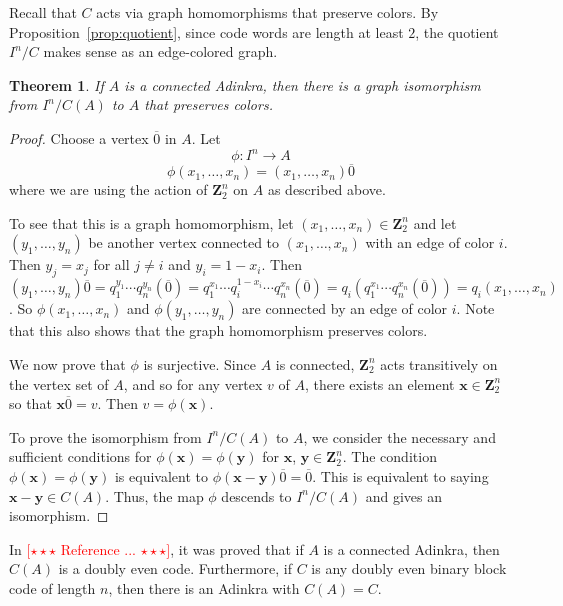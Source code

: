 \documentclass[12pt,twoside,singlespace]{article}
\numberwithin{equation}{section}
\newtheorem{thm}[equation]{Theorem}
\theoremstyle{definition}
\newcommand{\ZZ}{\mathbf{Z}}
\newcommand{\com}[1]{\textcolor{red}{$[\star \star \star$ #1 $\star \star \star]$}}
\renewcommand{\vec}[1]{\mathbf{#1}}
\begin{document}
Recall that $C$ acts via graph homomorphisms that preserve colors.  By Proposition~\ref{prop:quotient}, since code words are length at least $2$, the quotient $I^n/C$ makes sense as an edge-colored graph.

\begin{thm}
\label{thm:cubemodulocode}
If $A$ is a connected Adinkra, then there is a graph isomorphism from $I^n/C(A)$ to $A$ that preserves colors.
\end{thm}
\begin{proof}
Choose a vertex $\overline{0}$ in $A$.  Let
\[\phi:I^n\to A\]
\[\phi(x_1,\ldots,x_n)=(x_1,\ldots,x_n)\overline{0}\]
where we are using the action of $\ZZ_2^n$ on $A$ as described above.

To see that this is a graph homomorphism, let $(x_1,\ldots,x_n)\in\ZZ_2^n$ and let $(y_1,\ldots,y_n)$ be another vertex connected to $(x_1,\ldots,x_n)$ with an edge of color $i$.  Then $y_j=x_j$ for all $j\not=i$ and $y_i=1-x_i$.  Then $(y_1,\ldots,y_n)\overline{0}=q_1^{y_1}\cdots q_n^{y_n}(\overline{0}) =  q_1^{x_1}\cdots q_i^{1-x_i}\cdots q_n^{x_n}(\overline{0})=q_i(q_1^{x_1}\cdots q_n^{x_n}(\overline{0}))=q_i(x_1,\ldots,x_n)$.  So $\phi(x_1,\ldots,x_n)$ and $\phi(y_1,\ldots,y_n)$ are connected by an edge of color $i$.  Note that this also shows that the graph homomorphism preserves colors.

We now prove that $\phi$ is surjective.  Since $A$ is connected, $\ZZ_2^n$ acts transitively on the vertex set of $A$, and so for any vertex $v$ of $A$, there exists an element $\vec{x} \in\ZZ_2^n$ so that $\vec{x} \overline{0}=v$.  Then $v=\phi(\vec{x})$.

To prove the isomorphism from $I^n/C(A)$ to $A$, we consider the necessary and sufficient conditions for $\phi(\vec{x})=\phi(\vec{y})$ for $\vec{x}$, $\vec{y}\in \ZZ_2^n$.  The condition $\phi(\vec{x})=\phi(\vec{y})$ is equivalent to $\phi(\vec{x}-\vec{y})\overline{0}=\overline{0}$.  This is equivalent to saying $\vec{x}-\vec{y}\in C(A)$.  Thus, the map $\phi$ descends to $I^n/C(A)$ and gives an isomorphism.
\end{proof}

In \com{Reference ...}, it was proved that if $A$ is a connected Adinkra, then $C(A)$ is a doubly even code.  Furthermore, if $C$ is any doubly even binary block code of length $n$, then there is an Adinkra with $C(A)=C$.
\end{document}
